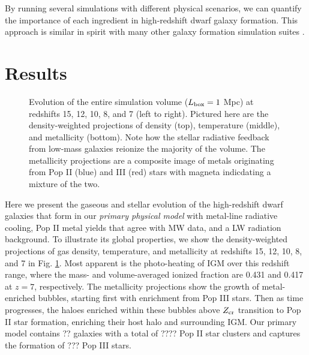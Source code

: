 \documentclass[useAMS,usenatbib]{mn2e}
\begin{document}
By running several simulations with different physical scenarios, we
can quantify the importance of each ingredient in high-redshift dwarf
galaxy formation.  This approach is similar in spirit with many other
galaxy formation simulation suites \citep[e.g.][]{Schaye10,
  Maio10_Pop32}.

\section{Results}
\label{sec:results}

\begin{figure*}
  \caption{\label{fig:evo-mosaic} Evolution of the entire simulation
    volume ($L_{\rm box} = 1$ Mpc) at redshifts 15, 12, 10, 8, and 7
    (left to right).  Pictured here are the density-weighted
    projections of density (top), temperature (middle), and
    metallicity (bottom).  Note how the stellar radiative feedback
    from low-mass galaxies reionize the majority of the volume.  The
    metallicity projections are a composite image of metals
    originating from Pop II (blue) and III (red) stars with magneta
    indicdating a mixture of the two.}
\end{figure*}




Here we present the gaseous and stellar evolution of the high-redshift
dwarf galaxies that form in our \textit{primary physical model} with
metal-line radiative cooling, Pop II metal yields that agree with MW
data, and a LW radiation background.  To illustrate its global
properties, we show the density-weighted projections of gas density,
temperature, and metallicity at redshifts 15, 12, 10, 8, and 7 in
Fig. \ref{fig:evo-mosaic}.  Most apparent is the photo-heating of IGM
over this redshift range, where the mass- and volume-averaged ionized
fraction are 0.431 and 0.417 at $z=7$, respectively.  The metallicity
projections show the growth of metal-enriched bubbles, starting first
with enrichment from Pop III stars.  Then as time progresses, the
haloes enriched within these bubbles above $Z_{\rm cr}$ transition to
Pop II star formation, enriching their host halo and surrounding IGM.
Our primary model contains ?? galaxies with a total of ???? Pop II
star clusters and captures the formation of ??? Pop III stars.
\end{document}
